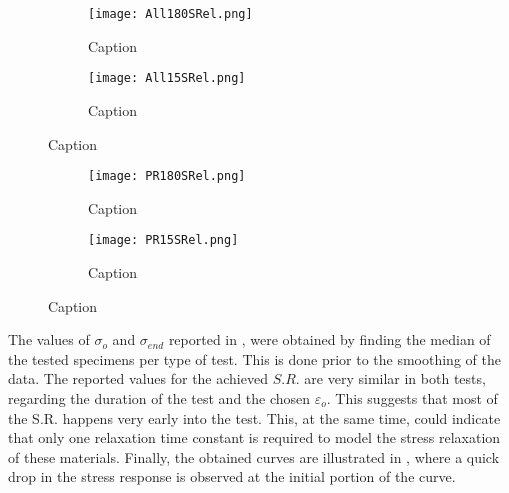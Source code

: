 \begin{figure}[H]
    \centering
        \begin{subfigure}[b]{0.93\textwidth}
        \centering
        \texttt{[image: All180SRel.png]}
        \caption{Caption}
        \label{sfig:ALL180SRel}
    \end{subfigure}
    \begin{subfigure}[b]{0.93\textwidth}
        \centering
        \texttt{[image: All15SRel.png]}
        \caption{Caption}
        \label{sfig:centering}
    \end{subfigure}
    \caption{Caption}
    \label{fig:AllSRel}
\end{figure}

\newpage
\begin{figure}[H]
    \centering
        \begin{subfigure}[b]{0.93\textwidth}
        \centering
        \texttt{[image: PR180SRel.png]}
        \caption{Caption}
        \label{sfig:PR180SRel}
    \end{subfigure}
    \begin{subfigure}[b]{0.93\textwidth}
        \centering
        \texttt{[image: PR15SRel.png]}
        \caption{Caption}
        \label{sfig:PR15SRel}
    \end{subfigure}
    \caption{Caption}
    \label{fig:PRSRel}
\end{figure}

The values of $\sigma_o$ and $\sigma_{end}$ reported in , were obtained by finding the median of the tested specimens per type of test. This is done prior to the smoothing of the data. The reported values for the achieved $S.R.$ are very similar in both tests, regarding the duration of the test and the chosen $\varepsilon_o$. This suggests that most of the S.R. happens very early into the test. This, at the same time, could indicate that only one relaxation time constant is required to model the stress relaxation of these materials. Finally, the obtained curves are illustrated in , where a quick drop in the stress response is observed at the initial portion of the curve.


